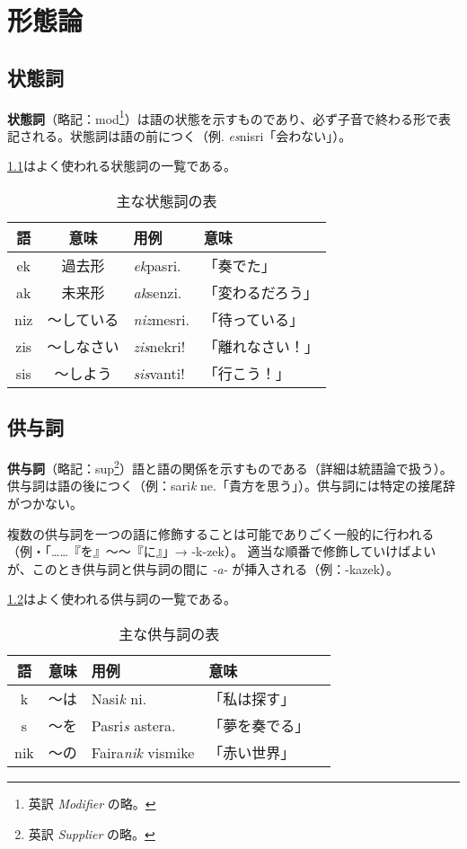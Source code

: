 \chapter{形態論}

\section{状態詞}
\textbf{状態詞}（略記：mod\footnote{英訳 \emph{Modifier} の略。}）は語の状態を示すものであり、必ず子音で終わる形で表記される。状態詞は語の前につく（例. \emph{es}nisri「会わない」）。

\cref{table:common-mods}はよく使われる状態詞の一覧である。

\begin{table}[H]
    \centering
    \caption{主な状態詞の表}
    \label{table:common-mods}
    \begin{tabular}{ccll}
        \toprule
        語 & 意味 & 用例 & 意味 \\
        \midrule
        ek  & 過去形 & \emph{ek}pasri. & 「奏でた」\\
        ak  & 未来形 & \emph{ak}senzi. & 「変わるだろう」 \\
        niz & ～している & \emph{niz}mesri. & 「待っている」 \\
        zis & ～しなさい & \emph{zis}nekri! & 「離れなさい！」\\
        sis & ～しよう & \emph{sis}vanti! & 「行こう！」\\
        \bottomrule
    \end{tabular}
\end{table}

\section{供与詞}

\textbf{供与詞}（略記：sup\footnote{英訳 \emph{Supplier} の略。}）語と語の関係を示すものである（詳細は統語論で扱う）。供与詞は語の後につく（例：sari\emph{k} ne.「貴方を思う」）。供与詞には特定の接尾辞がつかない。

複数の供与詞を一つの語に修飾することは可能でありごく一般的に行われる（例・「……『を』～～『に』」→ -k-zek）。
適当な順番で修飾していけばよいが、このとき供与詞と供与詞の間に \emph{-a-} が挿入される（例：-kazek）。

\cref{table:common-sups}はよく使われる供与詞の一覧である。

\begin{table}[H]
    \centering
    \caption{主な供与詞の表}
    \label{table:common-sups}
    \begin{tabular}{cclll}
        \toprule
        語 & 意味 & 用例 & 意味 \\
        \midrule
        k   & ～は & Nasi\emph{k} ni.     & 「私は探す」\\
        s   & ～を & Pasri\emph{s} astera. & 「夢を奏でる」\\
        nik & ～の & Faira\emph{nik} vismike & 「赤い世界」\\
        \bottomrule
    \end{tabular}
\end{table}

